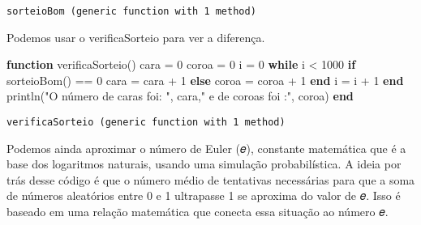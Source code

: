 \documentclass[
  letterpaper,
  DIV=11,
  numbers=noendperiod]{scrreprt}
\newenvironment{Shaded}{\begin{snugshade}}{\end{snugshade}}
\newcommand{\ControlFlowTok}[1]{\textcolor[rgb]{0.00,0.23,0.31}{\textbf{#1}}}
\newcommand{\FloatTok}[1]{\textcolor[rgb]{0.68,0.00,0.00}{#1}}
\newcommand{\FunctionTok}[1]{\textcolor[rgb]{0.28,0.35,0.67}{#1}}
\newcommand{\KeywordTok}[1]{\textcolor[rgb]{0.00,0.23,0.31}{\textbf{#1}}}
\newcommand{\NormalTok}[1]{\textcolor[rgb]{0.00,0.23,0.31}{#1}}
\newcommand{\OperatorTok}[1]{\textcolor[rgb]{0.37,0.37,0.37}{#1}}
\newcommand{\StringTok}[1]{\textcolor[rgb]{0.13,0.47,0.30}{#1}}
\begin{document}
\begin{verbatim}
sorteioBom (generic function with 1 method)
\end{verbatim}

Podemos usar o verificaSorteio para ver a diferença.

\begin{Shaded}
\begin{Highlighting}[]
\KeywordTok{function} \FunctionTok{verificaSorteio}\NormalTok{()}
\NormalTok{   cara }\OperatorTok{=} \FloatTok{0}
\NormalTok{   coroa }\OperatorTok{=} \FloatTok{0}
\NormalTok{   i }\OperatorTok{=} \FloatTok{0}
   \ControlFlowTok{while}\NormalTok{ i }\OperatorTok{\textless{}} \FloatTok{1000}
     \ControlFlowTok{if} \FunctionTok{sorteioBom}\NormalTok{() }\OperatorTok{==} \FloatTok{0}
\NormalTok{        cara }\OperatorTok{=}\NormalTok{ cara }\OperatorTok{+} \FloatTok{1}
     \ControlFlowTok{else}
\NormalTok{        coroa }\OperatorTok{=}\NormalTok{ coroa }\OperatorTok{+} \FloatTok{1}
     \ControlFlowTok{end}
\NormalTok{     i }\OperatorTok{=}\NormalTok{ i }\OperatorTok{+} \FloatTok{1}
   \ControlFlowTok{end}
   \FunctionTok{println}\NormalTok{(}\StringTok{"O número de caras foi: "}\NormalTok{, cara,}\StringTok{" e de coroas foi :"}\NormalTok{, coroa)}
\KeywordTok{end}
\end{Highlighting}
\end{Shaded}

\begin{verbatim}
verificaSorteio (generic function with 1 method)
\end{verbatim}

Podemos ainda aproximar o número de Euler (𝑒), constante matemática que
é a base dos logaritmos naturais, usando uma simulação probabilística. A
ideia por trás desse código é que o número médio de tentativas
necessárias para que a soma de números aleatórios entre 0 e 1 ultrapasse
1 se aproxima do valor de 𝑒. Isso é baseado em uma relação matemática
que conecta essa situação ao número 𝑒.
\end{document}
